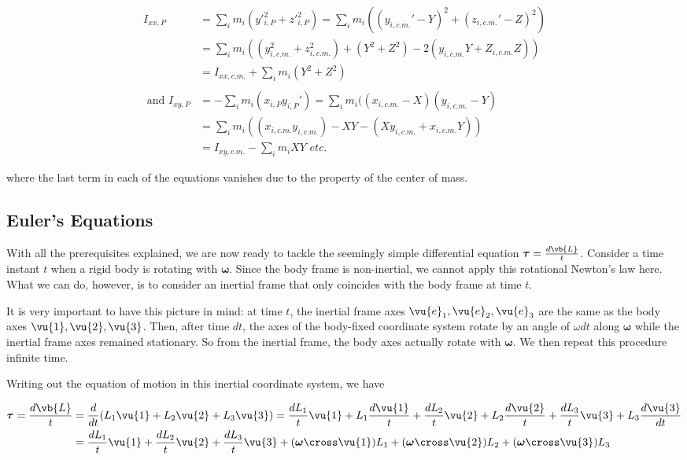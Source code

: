\documentclass[a4paper,12pt]{report}
\begin{document}
\begin{equation}
\begin{aligned}
	I_{xx,P} &= \sum_{i}^{} m_{i} (y'^2_{i,P} + z'^2_{i,P}) = \sum_{i}^{} m_{i} ( (y_{i,c.m. }' - Y)^2 + (z_{i,c.m. }' -Z)^2) \\ &= \sum_{i}^{} m_{i} ((y_{i,c.m.} ^2 + z_{i,c.m.} ^2)+(Y^2+Z^2) -2(y_{i,c.m. } Y+Z_{i,c.m. } Z)) \\ &= I_{xx,c.m. } + \sum_{i}^{ } m_{i} (Y^2+Z^2)  \\ \\
	\text{ and } I_{xy,P} &= -\sum_{i}^{} m_{i} ( x_{i,P} y_{i,P} ') = \sum_{i}^{} m_{i} ((x_{i,c.m. } -X)(y_{i,c.m. } -Y) \\ &= \sum_{i}^{} m_{i} ((x_{i,c.m. } y_{i,c.m. } ) - XY -(Xy_{i,c.m. } + x_{i,c.m. } Y)) \\ &= I_{xy,c.m. } - \sum_{i}^{} m_{i} XY \textit{ etc.}  
\end{aligned}
\end{equation}

where the last term in each of the equations vanishes due to the property of the center of mass.

\subsection{Euler's Equations}
With all the prerequisites explained, we are now ready to tackle the seemingly simple differential equation \(\boldsymbol{\tau } = \frac{d \vb{L}}{t} \). Consider a time instant \(t\) when a rigid body is rotating with \(\boldsymbol{\omega } \). Since the body frame is non-inertial, we cannot apply this rotational Newton's law here. What we can do, however, is to consider an inertial frame that only coincides with the body frame at time \(t\). 

It is very important to have this picture in mind: at time \(t\), the inertial frame axes \(\vu{e} _{1}, \vu{e} _{2}, \vu{e} _{3} \) are the same as the body axes \(\vu{1}, \vu{2},\vu{3} \). Then, after time \(dt\), the axes of the body-fixed coordinate system rotate by an angle of \(\omega dt\) along \(\boldsymbol{\omega } \) while the inertial frame axes remained stationary. So from the inertial frame, the body axes actually rotate with \(\boldsymbol{\omega } \). We then repeat this procedure infinite time.

Writing out the equation of motion in this inertial coordinate system, we have

\begin{equation}
	\begin{aligned}
		\boldsymbol{\tau } = \frac{d \vb{L}}{t} &= \frac{d}{dt} (L_1 \vu{1} + L_2 \vu{2} + L_3 \vu{3}  ) = \frac{d L_1}{t} \vu{1}  + L_{1} \frac{d \vu{1}}{t} + \frac{d L_2}{t} \vu{2}  + L_{2} \frac{d \vu{2}}{t} + \frac{d L_3}{t} \vu{3}  + L_{3} \frac{d \vu{3} }{dt}     \\ 
		&= \frac{d L_1}{t} \vu{1}  + \frac{d L_2}{t} \vu{2} + \frac{d L_3}{t} \vu{3}   + (\boldsymbol{\omega } \cross \vu{1}  )L_{1} + (\boldsymbol{\omega } \cross \vu{2}  )L_{2}  + (\boldsymbol{\omega } \cross \vu{3}  )L_{3} 
	\end{aligned}
\end{equation}
\end{document}
